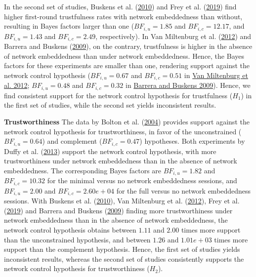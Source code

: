 \documentclass[
  11pt,
]{article}
\begin{document}
In the second set of studies, Buskens et al. (\protect\hyperlink{ref-buskens_raub_veer_triads_2010}{2010}) and Frey et al. (\protect\hyperlink{ref-frey_buskens_investments_2019}{2019}) find higher first-round trustfulness rates with network embeddedness than without, resulting in Bayes factors larger than one (\(BF_{i,u} = 1.85\) and \(BF_{i,c} = 12.17\), and \(BF_{i,u} = 1.43\) and \(BF_{i,c} = 2.49\), respectively).
In Van Miltenburg et al. (\protect\hyperlink{ref-miltenburg_buskens_triads_2012}{2012}) and Barrera and Buskens (\protect\hyperlink{ref-barrera_buskens_third_2009}{2009}), on the contrary, trustfulness is higher in the absence of network embeddedness than under network embeddedness.
Hence, the Bayes factors for these experiments are smaller than one, rendering support against the network control hypothesis (\(BF_{i,u} = 0.67\) and \(BF_{i,c} = 0.51\) in \protect\hyperlink{ref-miltenburg_buskens_triads_2012}{Van Miltenburg et al. 2012}; \(BF_{i,u} = 0.48\) and \(BF_{i,c} = 0.32\) in \protect\hyperlink{ref-barrera_buskens_third_2009}{Barrera and Buskens 2009}).
Hence, we find consistent support for the network control hypothesis for trustfulness (\(H_1\)) in the first set of studies, while the second set yields inconsistent results.

\textbf{Trustworthiness} \hspace{8pt} The data by Bolton et al. (\protect\hyperlink{ref-bolton_electronic_2004}{2004}) provides support against the network control hypothesis for trustworthiness, in favor of the unconstrained (\(BF_{i,u} = 0.64\)) and complement (\(BF_{i,c} = 0.47\)) hypotheses.
Both experiments by Duffy et al. (\protect\hyperlink{ref-duffy2013social}{2013}) support the network control hypothesis, with more trustworthiness under network embeddedness than in the absence of network embeddedness.
The corresponding Bayes factors are \(BF_{i,u} = 1.82\) and \(BF_{i,c} = 10.32\) for the minimal versus no network embeddedness sessions, and \(BF_{i,u} = 2.00\) and \(BF_{i,c} = 2.60e+04\) for the full versus no network embeddedness sessions.
With Buskens et al. (\protect\hyperlink{ref-buskens_raub_veer_triads_2010}{2010}), Van Miltenburg et al. (\protect\hyperlink{ref-miltenburg_buskens_triads_2012}{2012}), Frey et al. (\protect\hyperlink{ref-frey_buskens_investments_2019}{2019}) and Barrera and Buskens (\protect\hyperlink{ref-barrera_buskens_third_2009}{2009}) finding more trustworthiness under network embeddedness than in the absence of network embeddedness, the network control hypothesis obtains between \(1.11\) and \(2.00\) times more support than the unconstrained hypothesis, and between \(1.26\) and \(1.01e+03\) times more support than the complement hypothesis.
Hence, the first set of studies yields inconsistent results, whereas the second set of studies consistently supports the network control hypothesis for trustworthiness (\(H_2\)).
\end{document}
